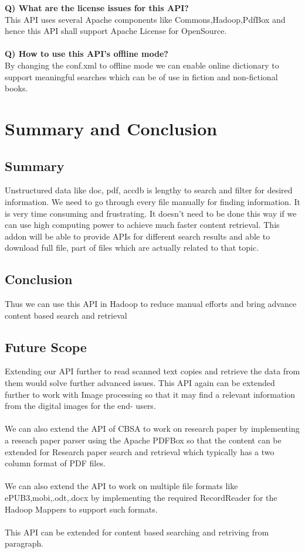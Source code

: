 \documentclass[oneside,a4paper,12pt]{report}
\begin{document}
{\noindent\textbf{Q) What are the license issues for this API?}\\
This API uses several Apache components like Commons,Hadoop,PdfBox and hence this API shall support Apache License for OpenSource.\\\\

\noindent\textbf{Q) How to use this API's offline mode?}\\
By changing the conf.xml to offline mode we can enable online dictionary to support meaningful searches which can be of use in fiction and non-fictional books.


\chapter{Summary and Conclusion}
\section{Summary}
Unstructured data like doc, pdf, accdb is lengthy to search and filter for desired information. We need to go through every file manually for finding information. It is very time consuming and frustrating. It doesn’t need to be done this way if we can use high computing power to achieve much faster content retrieval. This addon will be able to provide APIs for different search results and able to download full file, part of files which are actually related to that topic. 

\section{Conclusion}
Thus we can use this API in Hadoop to reduce manual efforts and bring advance content based search and retrieval

\section{Future Scope}
Extending our API further to read scanned text copies and retrieve the data from them would solve further advanced issues. This API again can be extended further to work with Image processing so that it may find a relevant information from the digital images for the end- users.\\\\
We can also extend the API of CBSA to work on research paper by implementing a reseach paper parser using the Apache PDFBox so that the content can be extended for Research paper search and retrieval which typically has a two column format of PDF files.\\\\
We can also extend the API to work on multiple file formats like ePUB3,mobi,.odt,.docx by implementing the required RecordReader for the Hadoop Mappers to support such formats.\\\\
This API can be extended for content based searching and retriving from paragraph.


}
\end{document}
